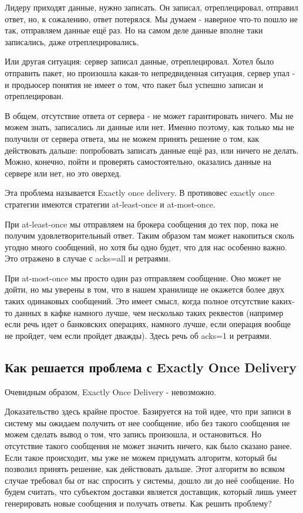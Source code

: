 \documentclass[11pt]{article}
\begin{document}
    Лидеру приходят данные, нужно записать. Он записал, отреплецировал, отправил ответ, но, к сожалению, ответ потерялся. Мы думаем - наверное что-то пошло не так, отправляем данные ещё раз. Но на самом деле данные вполне таки записались, даже отреплецировались.

    Или другая ситуация: сервер записал данные, отреплецировал. Хотел было отправить пакет, но произошла какая-то непредвиденная ситуация, сервер упал - и продьюсер понятия не имеет о том, что пакет был успешно записан и отреплецирован.

    В общем, отсутствие ответа от сервера - не может гарантировать ничего. Мы не можем знать, записались ли данные или нет. Именно поэтому, как только мы не получили от сервера ответа, мы не можем принять решение о том, как действовать дальше: попробовать записать данные ещё раз, или ничего не делать. Можно, конечно, пойти и проверять самостоятельно, оказались данные на сервере или нет, но это оверхед.

    Эта проблема называется Exactly once delivery. В противовес exactly once стратегии имеются стратегии at-least-once и at-most-once.

    При at-least-once мы отправляем на брокера сообщения до тех пор, пока не получим удовлетворительный ответ. Таким образом там может накопиться сколь угодно много сообщений, но хотя бы одно будет, что для нас особенно важно. Это отражено в случае с acks=all и ретраями.

    При at-most-once мы просто один раз отправляем сообщение. Оно может не дойти, но мы уверены в том, что в нашем хранилище не окажется более двух таких одинаковых сообщений. Это имеет смысл, когда полное отсутствие каких-то данных в кафке намного лучше, чем несколько таких реквестов (например если речь идет о банковских операциях, намного лучше, если операция вообще не пройдет, чем если пройдет дважды). Здесь речь об acks=1 и ретраями.

    \subsection{Как решается проблема с Exactly Once Delivery}
    Очевидным образом, Exactly Once Delivery - невозможно.

    Доказательство здесь крайне простое. Базируется на той идее, что при записи в систему мы ожидаем получить от нее
    сообщение, ибо без такого сообщения не можем сделать вывод о том, что запись произошла, и остановиться. Но
    отсутствие такого сообщения не может значить ничего, как было сказано ранее.
    Если такое происходит, мы уже не можем придумать алгоритм, который бы позволил принять решение, как действовать дальше. Этот алгоритм во всяком случае требовал бы от нас спросить у системы, дошло ли до неё сообщение. Но будем считать, что субъектом доставки является доставщик, который лишь умеет генерировать новые сообщения и получать ответы. Как решить проблему?
\end{document}
